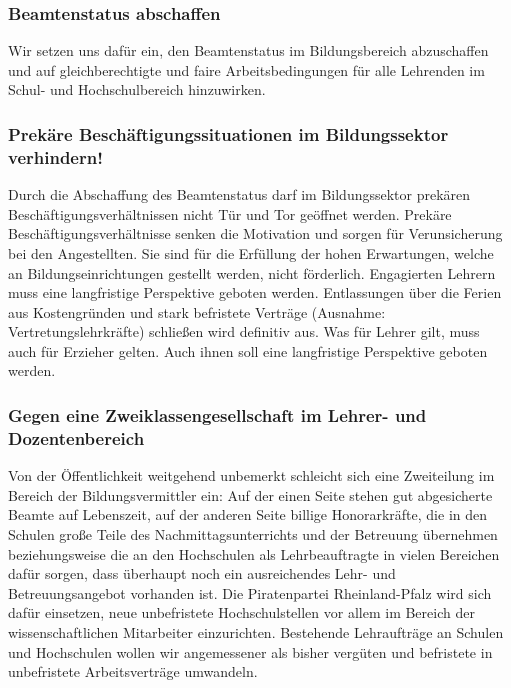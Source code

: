 \subsubsection{Beamtenstatus abschaffen}
\abstimmung
Wir setzen uns dafür ein, den Beamtenstatus im Bildungsbereich abzuschaffen und auf gleichberechtigte und faire Arbeitsbedingungen für alle Lehrenden im Schul- und Hochschulbereich hinzuwirken.
 

\label{wp:bildung:prekaer}

\subsubsection{Prekäre Beschäftigungssituationen im Bildungssektor verhindern!}
\abstimmung
Durch die Abschaffung des Beamtenstatus darf im Bildungssektor prekären Beschäftigungsverhältnissen nicht Tür und Tor geöffnet werden. Prekäre Beschäftigungsverhältnisse senken die Motivation und sorgen für Verunsicherung bei den Angestellten. Sie sind für die Erfüllung der hohen Erwartungen, welche an Bildungseinrichtungen gestellt werden, nicht förderlich. Engagierten Lehrern muss eine langfristige Perspektive geboten werden. Entlassungen über die Ferien aus Kostengründen und stark befristete Verträge (Ausnahme: Vertretungslehrkräfte) schließen wird definitiv aus. Was für Lehrer gilt, muss auch für Erzieher gelten. Auch ihnen soll eine langfristige Perspektive geboten werden.
 

\subsubsection{Gegen eine Zweiklassengesellschaft im Lehrer- und Dozentenbereich}
\abstimmung
Von der Öffentlichkeit weitgehend unbemerkt schleicht sich eine Zweiteilung im Bereich der Bildungsvermittler ein: Auf der einen Seite stehen gut abgesicherte Beamte auf Lebenszeit, auf der anderen Seite billige Honorarkräfte, die in den Schulen große Teile des Nachmittagsunterrichts und der Betreuung übernehmen beziehungsweise die an den Hochschulen als Lehrbeauftragte in vielen Bereichen dafür sorgen, dass überhaupt noch ein ausreichendes Lehr- und Betreuungsangebot vorhanden ist. Die Piratenpartei Rheinland-Pfalz wird sich dafür einsetzen, neue unbefristete Hochschulstellen vor allem im Bereich der wissenschaftlichen Mitarbeiter einzurichten. Bestehende Lehraufträge an Schulen und Hochschulen wollen wir angemessener als bisher vergüten und befristete in unbefristete Arbeitsverträge umwandeln.
 
